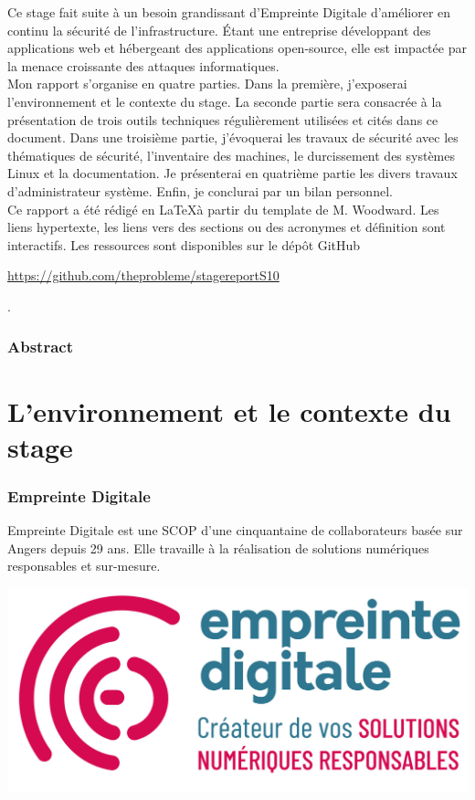 \documentclass[12pt]{article}
\begin{document}
Ce stage fait suite à un besoin grandissant d'Empreinte Digitale d'améliorer en continu la sécurité de l'infrastructure. 
Étant une entreprise développant des applications web et hébergeant des applications open-source, elle est impactée par la menace croissante des attaques informatiques. \\

Mon rapport s'organise en quatre parties. 
Dans la première, j'exposerai l'environnement et le contexte du stage. 
La seconde partie sera consacrée à la présentation de trois outils techniques régulièrement utilisées et cités dans ce document. 
Dans une troisième partie, j'évoquerai les travaux de sécurité avec les thématiques de sécurité, l'inventaire des machines, le durcissement des systèmes \gls{Linux} et la documentation. 
Je présenterai en quatrième partie les divers travaux d'administrateur système. 
Enfin, je conclurai par un bilan personnel. \\

Ce rapport a été rédigé en \LaTeX à partir du template de M. Woodward. 
Les liens hypertexte, les liens vers des sections ou des acronymes et définition sont interactifs.
Les ressources sont disponibles sur le dépôt GitHub \begin{hilite} \url{https://github.com/theprobleme/stagereportS10} \end{hilite}.

\newpage
\section*{Abstract}

\newpage
\part{L'environnement et le contexte du stage}
\section{Empreinte Digitale}
\noindent%
\begin{minipage}{.7\textwidth}%
Empreinte Digitale est une \gls{SCOP} d'une cinquantaine de collaborateurs basée sur Angers depuis 29 ans. 
Elle travaille à la réalisation de solutions numériques responsables et sur-mesure.
\end{minipage}%
\hfill
\begin{minipage}{.3\textwidth}%
\begin{center}
    \includegraphics[scale=0.3]{src/logo_ed.png}
\end{center}
\end{minipage}%
\end{document}
